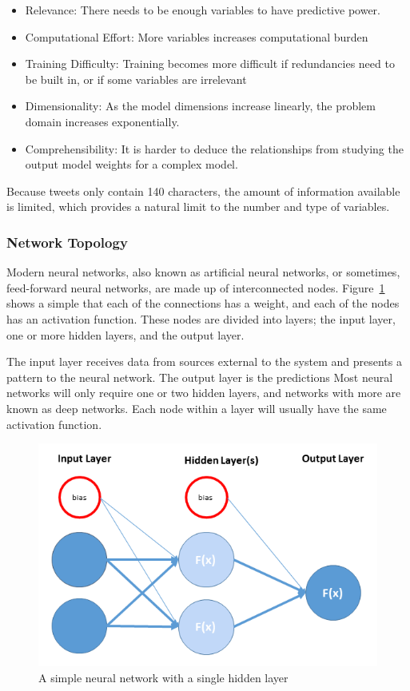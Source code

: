 \begin{itemize}
    \item Relevance: There needs to be enough variables to have predictive power.
    \item Computational Effort: More variables increases computational burden
    \item Training Difficulty: Training becomes more difficult if redundancies need to be built in, or if some variables are irrelevant
    \item Dimensionality: As the model dimensions increase linearly, the problem domain increases exponentially.
    \item Comprehensibility: It is harder to deduce the relationships from studying the output model weights for a complex model.
\end{itemize}

Because tweets only contain 140 characters, the amount of information available is limited, which provides a natural limit to the number and type of variables.

\subsubsection{Network Topology} \label{subsubsec:topology}

Modern neural networks, also known as artificial neural networks, or sometimes, feed-forward neural networks, are made up of interconnected nodes. Figure~\ref{fig:SimpleNetwork} shows a simple  that each of the connections has a weight, and each of the nodes has an activation function\cite{intro_ml}. These nodes are divided into layers; the input layer, one or more hidden layers, and the output layer.

The input layer receives data from sources external to the system and presents a pattern to the neural network. The output layer is the predictions 
Most neural networks will only require one or two hidden layers\cite{Goodfellow_deeplearning}, and networks with more are known as deep networks. Each node within a layer will usually have the same activation function.

\begin{figure}[H]
\caption{A simple neural network with a single hidden layer}
\label{fig:SimpleNetwork}
\centering
\includegraphics[width=1.0\textwidth]{Figures/SimpleANN.png}
\end{figure}

